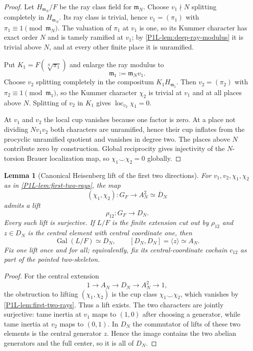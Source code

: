 \documentclass[11pt]{article}
\newtheorem{lemma}[theorem]{Lemma}
\theoremstyle{remark}
\providecommand{\Gal}{\operatorname{Gal}}
\providecommand{\loc}{\operatorname{loc}}
\begin{document}
\begin{proof}
Let $H_{\mathfrak m_N}/F$ be the ray class field for $\mathfrak m_N$.  Choose $v_1\nmid N$ splitting completely in $H_{\mathfrak m_N}$.  Its ray class is trivial, hence $v_1=(\pi_1)$ with $\pi_1\equiv1\pmod{\mathfrak m_N}$.  The valuation of $\pi_1$ at $v_1$ is one, so its Kummer character has exact order $N$ and is tamely ramified at $v_1$; by \cref{P1L-lem:deep-ray-modulus} it is trivial above $N$, and at every other finite place it is unramified.

Put $K_1=F(\sqrt[N]{\pi_1})$ and enlarge the ray modulus to
\[
 \mathfrak m_1:=\mathfrak m_N v_1.
\]
Choose $v_2$ splitting completely in the compositum $K_1H_{\mathfrak m_1}$.  Then $v_2=(\pi_2)$ with $\pi_2\equiv1\pmod{\mathfrak m_1}$, so the Kummer character $\chi_2$ is trivial at $v_1$ and at all places above $N$.  Splitting of $v_2$ in $K_1$ gives $\loc_{v_2}\chi_1=0$.

At $v_1$ and $v_2$ the local cup vanishes because one factor is zero.  At a place not dividing $Nv_1v_2$ both characters are unramified, hence their cup inflates from the procyclic unramified quotient and vanishes in degree two.  The places above $N$ contribute zero by construction.  Global reciprocity gives injectivity of the $N$-torsion Brauer localization map, so $\chi_1\smile\chi_2=0$ globally.
\end{proof}

\begin{lemma}[Canonical Heisenberg lift of the first two directions]\label{P1L-prop:ray-heisenberg-lift}
For $v_1,v_2,\chi_1,\chi_2$ as in \cref{P1L-lem:first-two-rays}, the map
\[
 (\chi_1,\chi_2):G_F\longrightarrow A_N^2\simeq \overline D_N
\]
admits a lift
\[
 \rho_{12}:G_F\longrightarrow D_N.
\]
Every such lift is surjective.  If $L/F$ is the finite extension cut out by $\rho_{12}$ and $z\in D_N$ is the central element with central coordinate one, then
\[
 \Gal(L/F)\simeq D_N,\qquad [D_N,D_N]=\langle z\rangle\simeq A_N.
\]
Fix one lift once and for all; equivalently, fix its central-coordinate cochain $c_{12}$ as part of the pointed two-skeleton.
\end{lemma}

\begin{proof}
For the central extension
\[
 1\longrightarrow A_N\longrightarrow D_N\longrightarrow A_N^2\longrightarrow1,
\]
the obstruction to lifting \((\chi_1,\chi_2)\) is the cup class
\(\chi_1\smile\chi_2\), which vanishes by \cref{P1L-lem:first-two-rays}.
Thus a lift exists.  The two characters are jointly surjective: tame inertia at $v_1$ maps to $(1,0)$ after choosing a generator, while tame inertia at $v_2$ maps to $(0,1)$.  In $D_N$ the commutator of lifts of these two elements is the central generator $z$.  Hence the image contains the two abelian generators and the full center, so it is all of $D_N$.
\end{proof}
\end{document}
